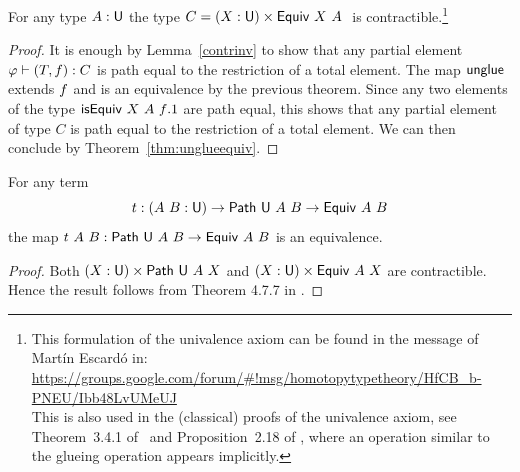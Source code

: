 %
\begin{corollary}
  \label{cor:equiv-contr}
  For any type $A : \mathsf{U}$ the type $C = (X : \mathsf{U}) \times {\sf Equiv}~X~A~$ is
  contractible.\footnote{This formulation of the univalence axiom
    can be found in the message of Martín Escardó in:\\
    \url{https://groups.google.com/forum/\#!msg/homotopytypetheory/HfCB_b-PNEU/Ibb48LvUMeUJ}\\
    This is also used in the (classical) proofs of the univalence
    axiom, see Theorem~3.4.1 of~\cite{KL} and Proposition~2.18 of
    \cite{Cisinski}, where an operation similar to the glueing
    operation appears implicitly.}
\end{corollary}
\begin{proof}
  It is enough by Lemma~\ref{contrinv} to show that any partial
  element $\varphi \vdash (T,f{}):C$ is path equal to the restriction
  of a total element. The map ${\sf unglue}$ extends $f{}$ and is an
  equivalence by the previous theorem. Since any two elements of the
  type ${\sf isEquiv}~X~A~f{}.1$ are path equal, this shows that any
  partial element of type $C$ is path equal to the restriction of a
  total element.  We can then conclude by
  Theorem~\ref{thm:unglueequiv}.
\end{proof}


\begin{corollary}\label{univalence} For any term
  \[
  t : (A~B : \mathsf{U}) \rightarrow {\sf Path}~\mathsf{U}~A~B \rightarrow {\sf Equiv}~A~B
  \]
  the map $t~A~B:{\sf Path}~\mathsf{U}~A~B\rightarrow {\sf Equiv}~A~B$ is an
  equivalence.
\end{corollary}
\begin{proof}
Both $(X : \mathsf{U}) \times {\sf Path}~\mathsf{U}~A~X$ and $(X : \mathsf{U}) \times {\sf Equiv}~A~X$
are contractible. Hence the result follows from Theorem 4.7.7 in
\cite{hott-book}.
\end{proof}

